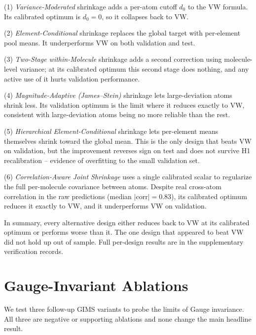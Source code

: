 \documentclass{article}
\begin{document}
(1) \emph{Variance-Moderated} shrinkage adds a per-atom cutoff $d_0$ to the
VW formula. Its calibrated optimum is $d_0=0$, so it collapses back to VW. \par
(2) \emph{Element-Conditional} shrinkage replaces the global target with
per-element pool means. It underperforms VW on both validation and test. \par
(3) \emph{Two-Stage within-Molecule} shrinkage adds a second correction
using molecule-level variance; at its calibrated optimum this second stage
does nothing, and any active use of it hurts validation performance. \par
(4)
\emph{Magnitude-Adaptive (James--Stein)} shrinkage lets large-deviation
atoms shrink less. Its validation optimum is the limit where it reduces
exactly to VW, consistent with large-deviation atoms being no more reliable
than the rest. \par
(5) \emph{Hierarchical Element-Conditional} shrinkage lets
per-element means themselves shrink toward the global mean. This is the
only design that beats VW on validation, but the improvement reverses sign
on test and does not survive H1 recalibration -- evidence of overfitting to
the small validation set. \par
(6) \emph{Correlation-Aware Joint Shrinkage} uses
a single calibrated scalar to regularize the full per-molecule covariance
between atoms. Despite real cross-atom correlation in the raw predictions
(median $|\text{corr}|=0.83$), its calibrated optimum reduces it exactly to
VW, and it underperforms VW on validation.

In summary, every alternative design either reduces back to VW at its
calibrated optimum or performs worse than it. The one design that appeared
to beat VW did not hold up out of sample. Full per-design results are in
the supplementary verification records.

\section{Gauge-Invariant Ablations}
\label{app:gims-ablations}

We test three follow-up GIMS variants to probe the limits of Gauge
invariance. All three are negative or supporting ablations and none change
the main headline result.
\end{document}
